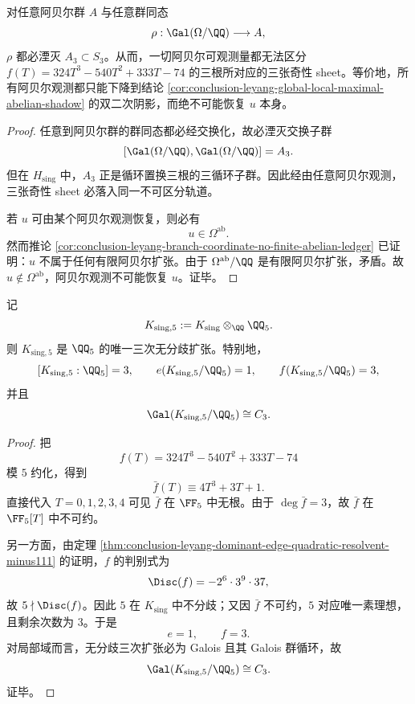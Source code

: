 \begin{theorem}\label{thm:conclusion-leyang-global-local-abelianization-kills-sheets}
对任意阿贝尔群 \(A\) 与任意群同态
\[
\rho:\Gal(\Omega/\QQ)\longrightarrow A,
\]
\(\rho\) 都必湮灭 \(A_3\subset S_3\)。从而，一切阿贝尔可观测量都无法区分 \(f(T)=324T^3-540T^2+333T-74\) 的三根所对应的三张奇性 sheet。等价地，所有阿贝尔观测都只能下降到结论 \ref{cor:conclusion-leyang-global-local-maximal-abelian-shadow} 的双二次阴影，而绝不可能恢复 \(u\) 本身。
\end{theorem}
\begin{proof}
任意到阿贝尔群的群同态都必经交换化，故必湮灭交换子群
\[
[\Gal(\Omega/\QQ),\Gal(\Omega/\QQ)]=A_3.
\]
但在 \(H_{\mathrm{sing}}\) 中，\(A_3\) 正是循环置换三根的三循环子群。因此经由任意阿贝尔观测，三张奇性 sheet 必落入同一不可区分轨道。

若 \(u\) 可由某个阿贝尔观测恢复，则必有
\[
u\in \Omega^{\mathrm{ab}}.
\]
然而推论 \ref{cor:conclusion-leyang-branch-coordinate-no-finite-abelian-ledger} 已证明：\(u\) 不属于任何有限阿贝尔扩张。由于 \(\Omega^{\mathrm{ab}}/\QQ\) 是有限阿贝尔扩张，矛盾。故 \(u\notin \Omega^{\mathrm{ab}}\)，阿贝尔观测不可能恢复 \(u\)。证毕。
\end{proof}

\begin{theorem}\label{thm:conclusion-leyang-global-local-q5-unramified-cubic}
记
\[
K_{\mathrm{sing},5}:=K_{\mathrm{sing}}\otimes_{\QQ}\QQ_5.
\]
则 \(K_{\mathrm{sing},5}\) 是 \(\QQ_5\) 的唯一三次无分歧扩张。特别地，
\[
[K_{\mathrm{sing},5}:\QQ_5]=3,
\qquad
e(K_{\mathrm{sing},5}/\QQ_5)=1,
\qquad
f(K_{\mathrm{sing},5}/\QQ_5)=3,
\]
并且
\[
\Gal(K_{\mathrm{sing},5}/\QQ_5)\cong C_3.
\]
\end{theorem}
\begin{proof}
把
\[
f(T)=324T^3-540T^2+333T-74
\]
模 \(5\) 约化，得到
\[
\bar f(T)\equiv 4T^3+3T+1.
\]
直接代入 \(T=0,1,2,3,4\) 可见 \(\bar f\) 在 \(\FF_5\) 中无根。由于 \(\deg \bar f=3\)，故 \(\bar f\) 在 \(\FF_5[T]\) 中不可约。

另一方面，由定理 \ref{thm:conclusion-leyang-dominant-edge-quadratic-resolvent-minus111} 的证明，\(f\) 的判别式为
\[
\Disc(f)=-2^6\cdot 3^9\cdot 37,
\]
故 \(5\nmid \Disc(f)\)。因此 \(5\) 在 \(K_{\mathrm{sing}}\) 中不分歧；又因 \(\bar f\) 不可约，\(5\) 对应唯一素理想，且剩余次数为 \(3\)。于是
\[
e=1,\qquad f=3.
\]
对局部域而言，无分歧三次扩张必为 Galois 且其 Galois 群循环，故
\[
\Gal(K_{\mathrm{sing},5}/\QQ_5)\cong C_3.
\]
证毕。
\end{proof}

